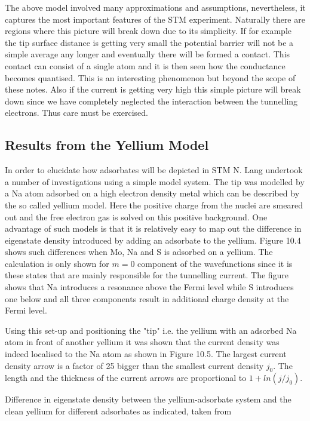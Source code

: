 The above model involved many approximations and assumptions, nevertheless, it captures the most important features of the STM experiment. Naturally there are regions where this picture will break down due to its simplicity. If for example the tip surface distance is getting very small the potential barrier will not be a simple average any longer and eventually there will be formed a contact. This contact can consist of a single atom and it is then seen how the conductance becomes quantised. This is an interesting phenomenon but beyond the scope of these notes. Also if the current is getting very high this simple picture will break down since we have completely neglected the interaction between the tunnelling electrons. Thus care must be exercised.

\subsection{Results from the Yellium Model}
In order to elucidate how adsorbates will be depicted in STM N. Lang \cite{Lang} undertook a number of investigations using  a simple model system. The tip was modelled by a Na atom adsorbed on a high electron density metal which can be described by the so called yellium model. Here the positive charge from the nuclei are smeared out and the free electron gas is solved on this positive background. One advantage of such models is that it is relatively easy to map out the difference in eigenstate density introduced by adding an adsorbate to the yellium. Figure 10.4 shows such differences when Mo, Na and S is adsorbed on a yellium. The calculation is only shown for $m=0$ component of the wavefunctions since it is these states that are mainly  responsible for  the tunnelling current. The figure shows that Na introduces a resonance above the Fermi level while S introduces one below and all three components result in additional charge density at the Fermi level.

Using this set-up and positioning the "tip" i.e. the yellium with an adsorbed  Na atom in front of another yellium it was shown that the current density was indeed localised to the Na atom as shown in Figure 10.5. The largest current density arrow is a factor of 25 bigger than the smallest current density $j_0$. The length and the thickness of the current arrows are proportional to $1+ln(j/j_0)$.
 
\vspace*{8cm}

 Difference in eigenstate density between the yellium-adsorbate system and the clean yellium for different adsorbates as indicated, taken from \cite{Lang}

